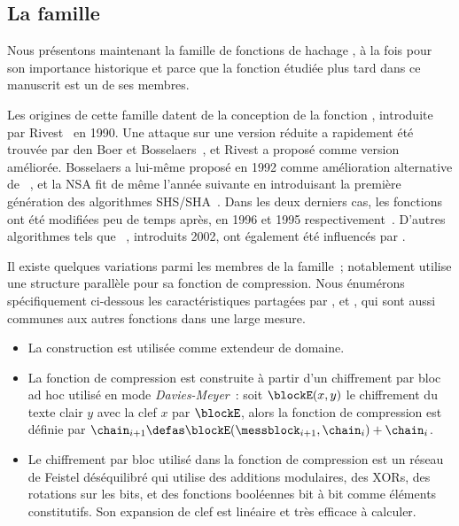\subsection{La famille \mdsha}
\label{sec:fmdsha}

Nous présentons maintenant la famille de fonctions de hachage \mdsha, à la fois pour son importance historique et parce que la fonction \shaone étudiée plus tard
dans ce manuscrit est un de ses membres.

Les origines de cette famille datent de la conception de la fonction \mdfour, introduite par Rivest~\cite{Rivest-md4} en 1990.
Une attaque sur une version réduite a rapidement été trouvée par
den Boer et Bosselaers~\cite{DBLP:conf/crypto/BoerB91},
et Rivest a proposé \mdfive comme version améliorée.
Bosselaers a lui-même proposé \ripemd en 1992 comme amélioration alternative de \mdfour~\cite[Chapitre 3]{DBLP:books/sp/BosselaersP95},
et la NSA fit de même l'année suivante en introduisant la première génération des algorithmes SHS/SHA~\cite{Nist-SHA0}.
Dans les deux derniers cas, les fonctions ont été modifiées peu de temps après, en
1996 et 1995 respectivement~\cite{DBLP:conf/fse/DobbertinBP96,Nist-SHA1}.
D'autres algorithmes tels que
\shatwo~\cite{Nist-SHA}, introduits 2002, ont également été influencés par \mdfour.

Il existe quelques variations parmi les membres de la famille~; notablement
\ripemd utilise une structure parallèle pour sa fonction de compression.
Nous énumérons spécifiquement ci-dessous les caractéristiques partagées par
\mdfour, \mdfive et \sha, qui sont aussi communes aux autres fonctions
\mdsha dans une large mesure.
\begin{itemize}
\item La construction \merkdam est utilisée comme extendeur de domaine.
\item La fonction de compression est construite à partir d'un chiffrement par bloc ad hoc utilisé en mode \emph{Davies-Meyer}~:
soit
$\blockE(x,y)$ le chiffrement du texte clair $y$ avec la clef $x$ par  $\blockE$, alors
la fonction de compression est définie par
$\chain_{i+1} \defas \blockE(\messblock_{i+1},\chain_i) + \chain_i$.
\item Le chiffrement par bloc utilisé dans la fonction de compression est un réseau de Feistel déséquilibré qui utilise
des additions modulaires, des XORs, des rotations sur les bits, et des fonctions booléennes bit à bit comme éléments constitutifs.
Son expansion de clef est linéaire et très efficace à calculer.
\end{itemize}

